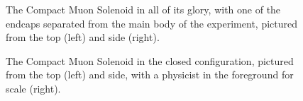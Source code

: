 \begin{figure}[htb]
    \centering
    \quad
    \caption{
        The Compact Muon Solenoid in all of its glory, with one of the endcaps separated from the main body of the experiment, pictured from the top (left) and side (right). 
    }
    \label{fig:cms_pics}
\end{figure}

\begin{figure}[htb]
    \centering
    \quad
    \caption{
        The Compact Muon Solenoid in the closed configuration, pictured from the top (left) and side, with a physicist in the foreground for scale (right).
    }
    \label{fig:cms_jguiang}
\end{figure}

